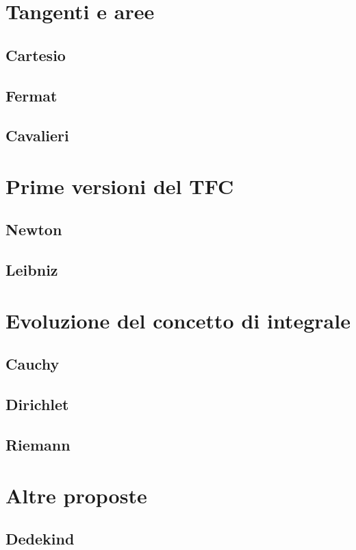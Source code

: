 \documentclass[8pt]{beamer}
\begin{document}
\section{Tangenti e aree}
\subsection{Cartesio}

\subsection{Fermat}


\subsection{Cavalieri}


\section{Prime versioni del TFC}
\subsection{Newton}

\subsection{Leibniz}


\section{Evoluzione del concetto di integrale}
\subsection{Cauchy}

\subsection{Dirichlet}

\subsection{Riemann}


\section{Altre proposte}
\subsection{Dedekind}

\end{document}
